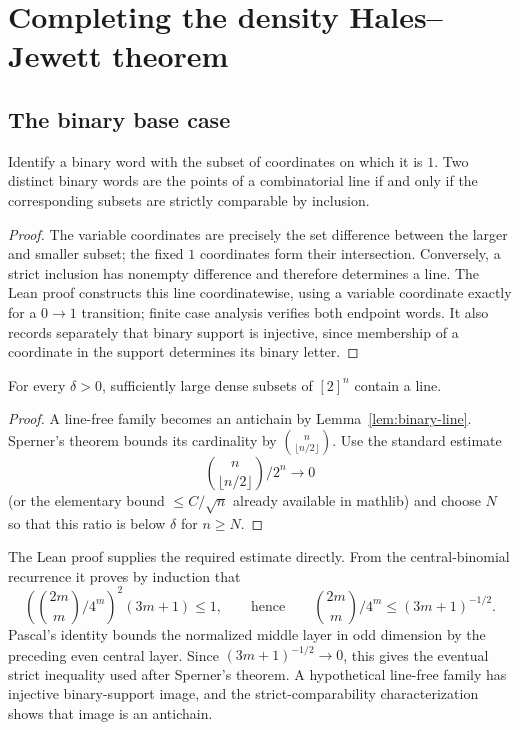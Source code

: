 \chapter{Completing the density Hales--Jewett theorem}
\label{chap:iteration}

\section{The binary base case}

\begin{lemma}
\label{lem:binary-line}
Identify a binary word with the subset of coordinates on which it is $1$.  Two distinct binary
words are the points of a combinatorial line if and only if the corresponding subsets are strictly
comparable by inclusion.
\end{lemma}

\begin{proof}
The variable coordinates are precisely the set difference between the larger and smaller subset;
the fixed $1$ coordinates form their intersection.  Conversely, a strict inclusion has nonempty
difference and therefore determines a line.
The Lean proof constructs this line coordinatewise, using a variable coordinate exactly for a
$0\to1$ transition; finite case analysis verifies both endpoint words.  It also records separately
that binary support is injective, since membership of a coordinate in the support determines its
binary letter.
\end{proof}

\begin{lemma}
\label{lem:dhj-two}
For every $\delta>0$, sufficiently large dense subsets of $[2]^n$ contain a line.
\end{lemma}

\begin{proof}
A line-free family becomes an antichain by Lemma~\ref{lem:binary-line}.  Sperner's theorem bounds
its cardinality by $\binom n{\lfloor n/2\rfloor}$.  Use the standard estimate
\[
 \binom n{\lfloor n/2\rfloor}/2^n\longrightarrow0
\]
(or the elementary bound $\leq C/\sqrt n$ already available in mathlib) and choose $N$ so that
this ratio is below $\delta$ for $n\geq N$.
\end{proof}

The Lean proof supplies the required estimate directly.  From the central-binomial recurrence it
proves by induction that
\[
 \left(\binom{2m}{m}/4^m\right)^2(3m+1)\leq1,
 \qquad\text{hence}\qquad
 \binom{2m}{m}/4^m\leq(3m+1)^{-1/2}.
\]
Pascal's identity bounds the normalized middle layer in odd dimension by the preceding even
central layer.  Since $(3m+1)^{-1/2}\to0$, this gives the eventual strict inequality used after
Sperner's theorem.  A hypothetical line-free family has injective binary-support image, and the
strict-comparability characterization shows that image is an antichain.

